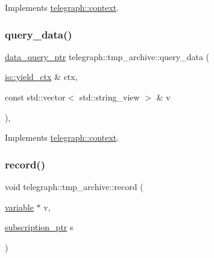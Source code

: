 Implements \hyperlink{classtelegraph_1_1context_a301114c9b73194507ae58221566a3e57}{telegraph\+::context}.

\mbox{\label{classtelegraph_1_1tmp__archive_a8a860d67e3733e2eee7a8315942450e5}} 
\subsubsection{\texorpdfstring{query\+\_\+data()}{query\_data()}\hspace{0.1cm}{\footnotesize\ttfamily [2/2]}}
{\footnotesize\ttfamily \hyperlink{namespacetelegraph_a6ffe775ac48dca2a4013b53d692199c8}{data\+\_\+query\+\_\+ptr} telegraph\+::tmp\+\_\+archive\+::query\+\_\+data (\begin{DoxyParamCaption}\item[{\hyperlink{structboost_1_1asio_1_1yield__ctx}{io\+::yield\+\_\+ctx} \&}]{ctx,  }\item[{const std\+::vector$<$ std\+::string\+\_\+view $>$ \&}]{v }\end{DoxyParamCaption})\hspace{0.3cm}{\ttfamily [override]}, {\ttfamily [virtual]}}



Implements \hyperlink{classtelegraph_1_1context_a34793623d2a2def580ad0b8710c74c6d}{telegraph\+::context}.

\mbox{\label{classtelegraph_1_1tmp__archive_a6c71e7bf706d35c3e751e0bc7c8555b9}} 
\subsubsection{\texorpdfstring{record()}{record()}}
{\footnotesize\ttfamily void telegraph\+::tmp\+\_\+archive\+::record (\begin{DoxyParamCaption}\item[{\hyperlink{classtelegraph_1_1variable}{variable} $\ast$}]{v,  }\item[{\hyperlink{namespacetelegraph_a58641aa5b1a2cbdb0431916a87069f64}{subscription\+\_\+ptr}}]{s }\end{DoxyParamCaption})}


